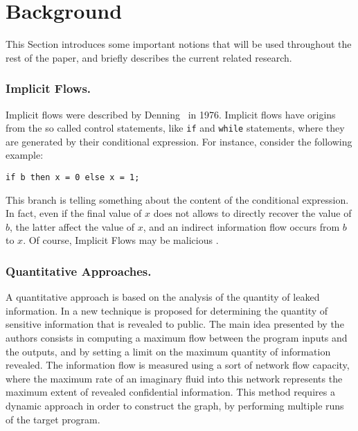 \documentclass{llncs}
\begin{document}
\section{Background}

This Section introduces some important notions that will be used throughout the rest of the paper, and briefly describes the current related research.

\subsubsection{Implicit Flows.}
Implicit flows were described by Denning~\cite{DD76} in 1976. Implicit flows have origins from the so called control statements, like \texttt{if} and \texttt{while} statements, where they are generated by their conditional expression. For instance, consider the following example:
\begin{lstlisting}[numbers=none]
if b then x = 0 else x = 1;
\end{lstlisting}
This branch is telling something about the content of the conditional expression. In fact, even if the final value of  $x$ does not allows to directly recover the value of $b$, the latter affect the value of $x$, and an indirect information flow occurs from $b$ to $x$. Of course, Implicit Flows may be  malicious \cite{Russo09implicitflows}. 

\subsubsection{Quantitative Approaches.}
A quantitative approach is based on the analysis of the quantity of leaked information. In \cite{McCamant08} a new technique is proposed for determining the quantity of sensitive information that is revealed to public. The main idea presented by the authors consists in computing a maximum flow between the program inputs and the outputs, and by setting a limit on the maximum quantity of information revealed. The information flow is  measured using a sort of network flow capacity, where the maximum rate of an imaginary fluid into this network represents the maximum extent of revealed confidential information. This method requires a dynamic approach in order to construct the graph, by  performing multiple runs of the target program. 
\end{document}
